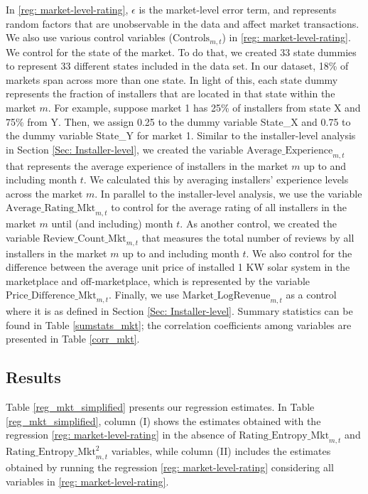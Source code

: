\documentclass[msom,blindrev]{informs3}
\begin{document}
 In \eqref{reg: market-level-rating}, $\epsilon$ is the market-level error term, and represents random factors that are unobservable in the data and affect market transactions. We also use various control variables ($\text{Controls}_{m,t}$) in \eqref{reg: market-level-rating}. We control for the state of the market. To do that, we created 33 state dummies to represent 33 different states included in the data set. In our dataset, 18\% of markets span across more than one state.  In light of this, each state dummy represents the fraction of installers that are located in that state within the market $m$. For example, suppose market 1 has 25\% of installers from state X and 75\% from Y. Then, we assign 0.25 to the dummy variable State\_X and 0.75 to the dummy variable State\_Y for market 1.  Similar to the installer-level analysis in Section \ref{Sec: Installer-level}, we created the variable $\text{Average\_Experience}_{m,t}$ that represents the average experience of installers in the market $m$ up to and including month $t$. We calculated this by averaging installers' experience levels across the market $m$. In parallel to the installer-level analysis, we use the variable $\text{Average\_Rating\_Mkt}_{m,t}$ to control for the average rating of all installers in the market $m$ until (and including) month $t$. As another control, we created the variable $\text{Review\_Count\_Mkt}_{m,t}$ that measures the total number of reviews by all installers in the market $m$ up to and including month $t$. We also control for the difference between the average unit price of installed 1 KW solar system in the marketplace and off-marketplace, which is represented by the variable $\text{Price\_Difference\_Mkt}_{m,t}$. Finally, we use $\text{Market\_LogRevenue}_{m,t}$ as a control where it is as defined in Section \ref{Sec: Installer-level}. Summary statistics can be found in Table \ref{sumstats_mkt}; the correlation coefficients among variables are presented in Table \ref{corr_mkt}.



\subsection{Results}


Table \ref{reg_mkt_simplified} presents our regression estimates. In Table \ref{reg_mkt_simplified}, column (I) shows the estimates obtained with the regression \eqref{reg: market-level-rating} in the absence of $\text{Rating\_Entropy\_Mkt}_{m,t}$ and $\text{Rating\_Entropy\_Mkt}^2_{m,t}$ variables, while column (II) includes the estimates obtained by running the regression \eqref{reg: market-level-rating} considering all variables in \eqref{reg: market-level-rating}.



\end{document}
